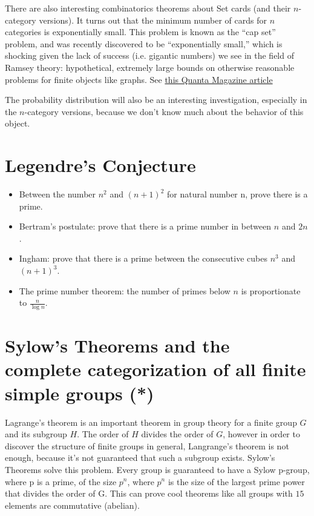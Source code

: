 \documentclass{article}
\begin{document}
    There are also interesting combinatorics theorems about Set cards (and their $n$-category versions).
    It turns out that the minimum number of cards for $n$ categories is exponentially small.
    This problem is known as the ``cap set'' problem, and was recently discovered to be ``exponentially small,'' which is shocking given the lack of success (i.e. gigantic numbers) we see in the field of Ramsey theory: hypothetical, extremely large bounds on otherwise reasonable problems for finite objects like graphs.
    See \href{https://www.quantamagazine.org/set-proof-stuns-mathematicians-20160531/}{this Quanta Magazine article}

    The probability distribution will also be an interesting investigation, especially in the $n$-category versions, because we don't know much about the behavior of this object.
    

\section{Legendre's Conjecture}
    \begin{itemize}
        \item Between the number $n^2$ and $(n + 1)^2$ for natural number n, prove there is a prime.
        \item Bertram's postulate: prove that there is a prime number in between $n$ and $2n$.
        \item Ingham: prove that there is a prime between the consecutive cubes $n^3$ and $(n + 1)^3$.
        \item The prime number theorem: the number of primes below $n$ is proportionate to $\frac{n}{\log n}$.
    \end{itemize}

    

\section{Sylow's Theorems and the complete categorization of all finite simple groups (*)}
    
    Lagrange's theorem is an important theorem in group theory for a finite group $G$ and its subgroup $H$. The order of $H$ divides the order of $G$, however in order to discover the structure of finite groups in general, Langrange's theorem is not enough, because it's not guaranteed that such a subgroup exists. Sylow's Theorems solve this problem. Every group is guaranteed to have a Sylow p-group, where p is a prime, of the size $p^n$, where $p^n$ is the size of the largest prime power that divides the order of G. This can prove cool theorems like all groups with $15$ elements are commutative (abelian).
    
\end{document}
